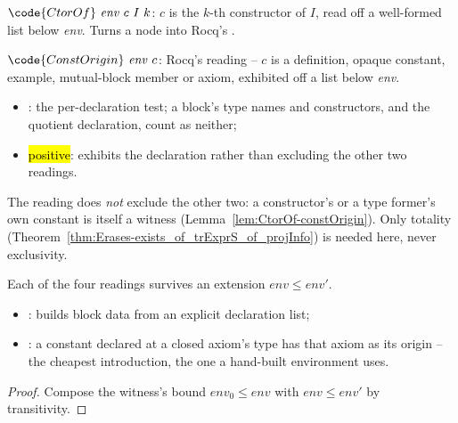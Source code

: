 \begin{definition}
\label{def:CtorOf}
\leanok
{}
 $\code{CtorOf}\ \mathit{env}\ c\ I\ k$: $c$ is the $k$-th constructor of $I$, read off a well-formed list below \emph{env}. Turns a  node into Rocq's .
\end{definition}

\begin{definition}
\label{def:ConstOrigin}
\leanok
{}
 $\code{ConstOrigin}\ \mathit{env}\ c$: Rocq's  reading -- $c$ is a definition, opaque constant, example, mutual-block member or axiom, exhibited off a list below \emph{env}.
\begin{itemize}
\item {}: the per-declaration test; a block's type names and constructors, and the quotient declaration, count as neither;
\item \hl{positive}: exhibits the declaration rather than excluding the other two readings.
\end{itemize}
 The reading does \emph{not} exclude the other two: a constructor's or a type former's own constant is itself a  witness (Lemma~\ref{lem:CtorOf-constOrigin}). Only totality (Theorem~\ref{thm:Erases-exists_of_trExprS_of_projInfo}) is needed here, never exclusivity.
\end{definition}

\begin{lemma}
\label{lem:IndInfo-mono}
\leanok
{}
 Each of the four readings survives an extension $\mathit{env} \le \mathit{env}'$.
\begin{itemize}
\item {}: builds block data from an explicit declaration list;
\item {}: a constant declared at a closed axiom's type has that axiom as its origin -- the cheapest introduction, the one a hand-built environment uses.
\end{itemize}
\end{lemma}
\begin{proof}
\leanok
{}
 Compose the witness's bound $\mathit{env}_0 \le \mathit{env}$ with $\mathit{env} \le \mathit{env}'$ by transitivity.
\end{proof}

